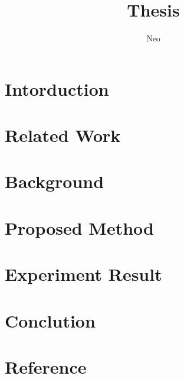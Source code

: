 \documentclass{article}
\title{Thesis}
\author{Neo}
\date{}
\begin{document}
\maketitle



\section{Intorduction}


\section{Related Work}


\section{Background}


\section{Proposed Method}


\section{Experiment Result}


\section{Conclution}


\section{Reference}

% 
% 
\end{document}

